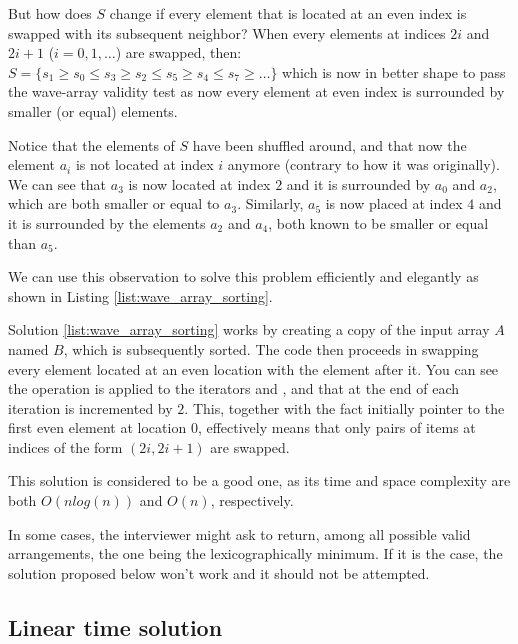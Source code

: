 But how does $S$ change if every element that is located at an even index is swapped with its subsequent neighbor?
When every elements at indices $2i$ and $2i+1$ ($i=0,1,\ldots$) are swapped, then:
$S=\{s_1 \geq s_0 \leq s_3 \geq s_2 \leq s_5 \geq s_4 \leq s_7  \geq \ldots\}$ which is now in better shape to pass the wave-array validity test as now every element at even index is surrounded by smaller (or equal) elements. 

Notice that the elements of $S$ have been shuffled around, and that now the element $a_i$ is not located at index $i$ anymore (contrary to how it was originally).
We can see that $a_3$ is now located at index $2$ and it is surrounded by $a_0$ and $a_2$, which are both smaller or equal to $a_3$.
Similarly, $a_5$ is now placed at index $4$ and it is surrounded by the elements $a_2$ and $a_4$, both known to be smaller or equal than $a_5$.

We can use this observation to solve this problem efficiently and elegantly as shown in  Listing \ref{list:wave_array_sorting}.



Solution \ref{list:wave_array_sorting} works by creating a copy of the input array $A$ named $B$, which is subsequently sorted. The code then proceeds in swapping every element located at an even location with the element after it. 
You can see the  operation is applied to the iterators  and , and that at the end of each iteration  is incremented by $2$.
This, together with the fact  initially pointer to the first even element at location $0$, effectively means that only pairs of items at indices of the form $(2i, 2i+1)$ are swapped.

This solution is considered to be a good one, as its time and space complexity are both $O(nlog(n))$
and $O(n)$, respectively.

In some cases, the interviewer might ask to return, among all possible valid arrangements, the one being the lexicographically minimum. If it is the case, the solution proposed below won't work and it should not be attempted.


\subsection{Linear time solution}

